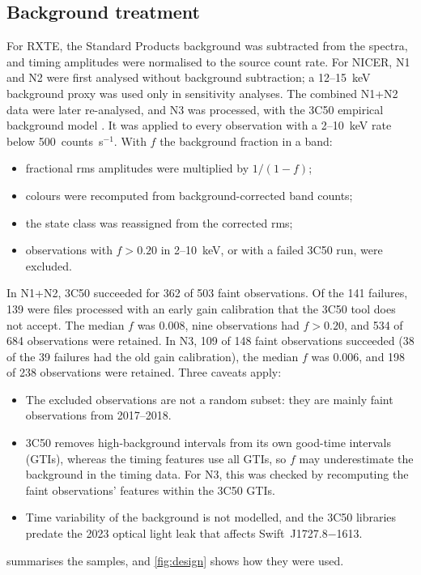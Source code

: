 \documentclass[11pt,a4paper]{article}
\begin{document}
\subsection{Background treatment}\label{sec:bkg}
For RXTE, the Standard Products background was subtracted from the spectra, and timing amplitudes were normalised to the
source count rate. For NICER, N1 and N2 were first analysed without background subtraction; a 12--15~keV background proxy
was used only in sensitivity analyses. The combined N1+N2 data were later re-analysed, and N3 was processed, with the
3C50 empirical background model \citep{Remillard2022}. It was applied to every observation with a 2--10~keV rate below
500~counts~s$^{-1}$. With $f$ the background fraction in a band:
\begin{itemize}\setlength\itemsep{1pt}
\item fractional rms amplitudes were multiplied by $1/(1-f)$;
\item colours were recomputed from background-corrected band counts;
\item the state class was reassigned from the corrected rms;
\item observations with $f>0.20$ in 2--10~keV, or with a failed 3C50 run, were excluded.
\end{itemize}
In N1+N2, 3C50 succeeded for 362 of 503 faint observations. Of the 141 failures, 139 were files processed with an early
gain calibration that the 3C50 tool does not accept. The median $f$ was 0.008, nine observations had $f>0.20$, and 534 of
684 observations were retained. In N3, 109 of 148 faint observations succeeded (38 of the 39 failures had the old gain
calibration), the median $f$ was 0.006, and 198 of 238 observations were retained. Three caveats apply:
\begin{itemize}\setlength\itemsep{1pt}
\item The excluded observations are not a random subset: they are mainly faint observations from 2017--2018.
\item 3C50 removes high-background intervals from its own good-time intervals (GTIs), whereas the timing features use all
GTIs, so $f$ may underestimate the background in the timing data. For N3, this was checked by recomputing the faint
observations' features within the 3C50 GTIs.
\item Time variability of the background is not modelled, and the 3C50 libraries predate the 2023 optical light leak
that affects Swift~J1727.8$-$1613.
\end{itemize}
 summarises the samples, and \cref{fig:design} shows how they were used.
\end{document}
